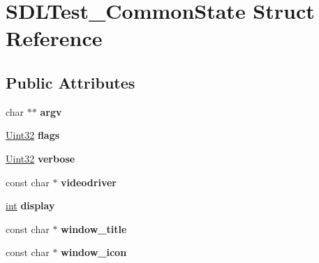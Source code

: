 \hypertarget{struct_s_d_l_test___common_state}{}\section{S\+D\+L\+Test\+\_\+\+Common\+State Struct Reference}
\label{struct_s_d_l_test___common_state}
\subsection*{Public Attributes}
\begin{DoxyCompactItemize}
\item 
\hypertarget{struct_s_d_l_test___common_state_a6db840410b86ab7c6807763fd8bcb081}{}char $\ast$$\ast$ {\bfseries argv}\label{struct_s_d_l_test___common_state_a6db840410b86ab7c6807763fd8bcb081}

\item 
\hypertarget{struct_s_d_l_test___common_state_a97272d03558f1f74e579ec8a5cdabc5e}{}\hyperlink{_s_d_l__stdinc_8h_add440eff171ea5f55cb00c4a9ab8672d}{Uint32} {\bfseries flags}\label{struct_s_d_l_test___common_state_a97272d03558f1f74e579ec8a5cdabc5e}

\item 
\hypertarget{struct_s_d_l_test___common_state_aad4b8ebf6277cd9d3608d2e1b48e4678}{}\hyperlink{_s_d_l__stdinc_8h_add440eff171ea5f55cb00c4a9ab8672d}{Uint32} {\bfseries verbose}\label{struct_s_d_l_test___common_state_aad4b8ebf6277cd9d3608d2e1b48e4678}

\item 
\hypertarget{struct_s_d_l_test___common_state_ab3face917946465c60dc0f38f179534d}{}const char $\ast$ {\bfseries videodriver}\label{struct_s_d_l_test___common_state_ab3face917946465c60dc0f38f179534d}

\item 
\hypertarget{struct_s_d_l_test___common_state_addb3de8e2b278deed8d2309bafd30758}{}\hyperlink{_s_d_l__thread_8h_a6a64f9be4433e4de6e2f2f548cf3c08e}{int} {\bfseries display}\label{struct_s_d_l_test___common_state_addb3de8e2b278deed8d2309bafd30758}

\item 
\hypertarget{struct_s_d_l_test___common_state_a86640ebac0afe0c504c3c324d84dcc37}{}const char $\ast$ {\bfseries window\+\_\+title}\label{struct_s_d_l_test___common_state_a86640ebac0afe0c504c3c324d84dcc37}

\item 
\hypertarget{struct_s_d_l_test___common_state_ac9e981b2b60a59f995153c74242d9d43}{}const char $\ast$ {\bfseries window\+\_\+icon}\label{struct_s_d_l_test___common_state_ac9e981b2b60a59f995153c74242d9d43}


\end{DoxyCompactItemize}
